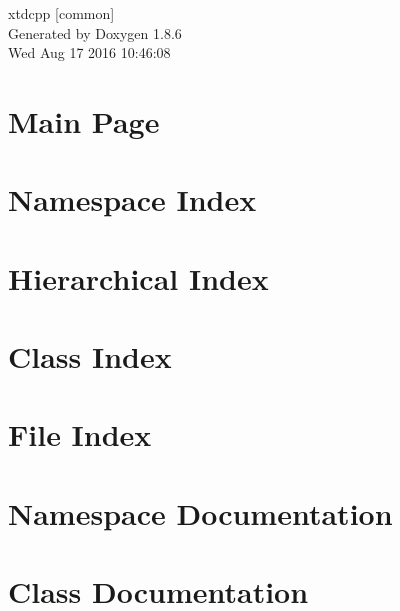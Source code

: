 \documentclass[twoside]{book}
\newcommand{\clearemptydoublepage}{%
  \newpage{\pagestyle{empty}\cleardoublepage}%
}
\begin{document}
\hypersetup{pageanchor=false}
\begin{titlepage}
\vspace*{7cm}
\begin{center}%
{\Large xtdcpp \mbox{[}common\mbox{]} }\\
\vspace*{1cm}
{\large Generated by Doxygen 1.8.6}\\
\vspace*{0.5cm}
{\small Wed Aug 17 2016 10:46:08}\\
\end{center}
\end{titlepage}
\clearemptydoublepage
\tableofcontents
\clearemptydoublepage
{}
\hypersetup{pageanchor=true}

\chapter{Main Page}
\label{index}\hypertarget{index}{}
\chapter{Namespace Index}

\chapter{Hierarchical Index}

\chapter{Class Index}

\chapter{File Index}

\chapter{Namespace Documentation}





\chapter{Class Documentation}











\end{document}
